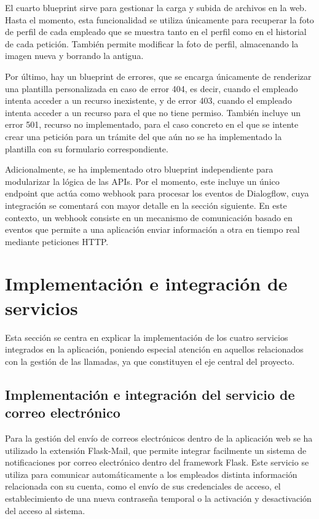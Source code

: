     El cuarto blueprint sirve para gestionar la carga y subida de archivos en la web. 
    Hasta el momento, esta funcionalidad se utiliza únicamente para recuperar la foto de perfil de cada empleado que se muestra tanto en el perfil como en el historial de cada petición. 
    También permite modificar la foto de perfil, almacenando la imagen nueva y borrando la antigua. 

    Por último, hay un blueprint de errores, que se encarga únicamente de renderizar una plantilla personalizada en caso de error 404, es decir, cuando el empleado intenta acceder a un recurso inexistente, y de error 403, cuando el empleado intenta acceder a un recurso para el que no tiene permiso. 
    También incluye un error 501, recurso no implementado, para el caso concreto en el que se intente crear una petición para un trámite del que aún no se ha implementado la plantilla con su formulario correspondiente. 
    
    Adicionalmente, se ha implementado otro blueprint independiente para modularizar la lógica de las APIs. 
    Por el momento, este incluye un único endpoint que actúa como webhook para procesar los eventos de Dialogflow, cuya integración se comentará con mayor detalle en la sección siguiente. 
    En este contexto, un webhook consiste en un mecanismo de comunicación basado en eventos que permite a una aplicación enviar información a otra en tiempo real mediante peticiones HTTP. 

\section{Implementación e integración de servicios}
    Esta sección se centra en explicar la implementación de los cuatro servicios integrados en la aplicación, poniendo especial atención en aquellos relacionados con la gestión de las llamadas, ya que constituyen el eje central del proyecto. 
    
    \subsection{Implementación e integración del servicio de correo electrónico}
        Para la gestión del envío de correos electrónicos dentro de la aplicación web se ha utilizado la extensión Flask-Mail, que permite integrar facilmente un sistema de notificaciones por correo electrónico dentro del framework Flask. 
        Este servicio se utiliza para comunicar automáticamente a los empleados distinta información relacionada con su cuenta, como el envío de sus credenciales de acceso, el establecimiento de una nueva contraseña temporal o la activación y desactivación del acceso al sistema. 

